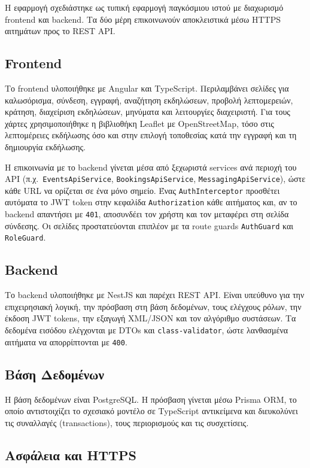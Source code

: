 \documentclass[11pt,a4paper]{article}
\newcommand{\code}[1]{\texttt{#1}}
\begin{document}
Η εφαρμογή σχεδιάστηκε ως τυπική εφαρμογή παγκόσμιου ιστού με διαχωρισμό frontend και
backend. Τα δύο μέρη επικοινωνούν αποκλειστικά μέσω HTTPS αιτημάτων προς το REST API.

\subsection{Frontend}

Το frontend υλοποιήθηκε με Angular και TypeScript. Περιλαμβάνει σελίδες για
καλωσόρισμα, σύνδεση, εγγραφή, αναζήτηση εκδηλώσεων, προβολή λεπτομερειών, κράτηση,
διαχείριση εκδηλώσεων, μηνύματα και λειτουργίες διαχειριστή. Για τους χάρτες
χρησιμοποιήθηκε η βιβλιοθήκη Leaflet με OpenStreetMap, τόσο στις λεπτομέρειες
εκδήλωσης όσο και στην επιλογή τοποθεσίας κατά την εγγραφή και τη δημιουργία εκδήλωσης.

Η επικοινωνία με το backend γίνεται μέσα από ξεχωριστά services ανά περιοχή του API
(π.χ.\ \code{EventsApiService}, \code{BookingsApiService}, \code{MessagingApiService}),
ώστε κάθε URL να ορίζεται σε ένα μόνο σημείο. Ένας \code{AuthInterceptor} προσθέτει
αυτόματα το JWT token στην κεφαλίδα \code{Authorization} κάθε αιτήματος και, αν το
backend απαντήσει με \code{401}, αποσυνδέει τον χρήστη και τον μεταφέρει στη σελίδα
σύνδεσης. Οι σελίδες προστατεύονται επιπλέον με τα route guards \code{AuthGuard} και
\code{RoleGuard}.

\subsection{Backend}

Το backend υλοποιήθηκε με NestJS και παρέχει REST API. Είναι υπεύθυνο για την
επιχειρησιακή λογική, την πρόσβαση στη βάση δεδομένων, τους ελέγχους ρόλων, την έκδοση
JWT tokens, την εξαγωγή XML/JSON και τον αλγόριθμο συστάσεων. Τα δεδομένα εισόδου
ελέγχονται με DTOs και \code{class-validator}, ώστε λανθασμένα αιτήματα να
απορρίπτονται με \code{400}.

\subsection{Βάση Δεδομένων}

Η βάση δεδομένων είναι PostgreSQL. Η πρόσβαση γίνεται μέσω Prisma ORM, το οποίο
αντιστοιχίζει το σχεσιακό μοντέλο σε TypeScript αντικείμενα και διευκολύνει τις
συναλλαγές (transactions), τους περιορισμούς και τις συσχετίσεις.

\subsection{Ασφάλεια και HTTPS}
\end{document}
